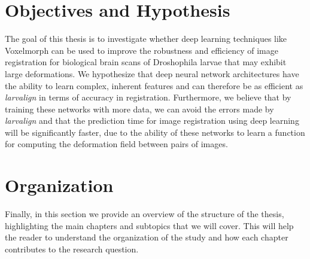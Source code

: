 \documentclass{book}
\begin{document}
	\section{Objectives and Hypothesis}
	The goal of this thesis is to investigate whether deep learning techniques like Voxelmorph \cite{Balakrishnan_2019} can be used to improve the robustness and efficiency of image registration for biological brain scans of Droshophila larvae that may exhibit large deformations. We hypothesize that deep neural network architectures have the ability to learn complex, inherent features and can therefore be as efficient as \textit{larvalign} \cite{larvalign} in terms of accuracy in registration. Furthermore, we believe that by training these networks with more data, we can avoid the errors made by \textit{larvalign} \cite{larvalign} and that the prediction time for image registration using deep learning will be significantly faster, due to the ability of these networks to learn a function for computing the deformation field between pairs of images.

	\section{Organization}
	Finally, in this section we provide an overview of the structure of the thesis, highlighting the main chapters and subtopics that we will cover. This will help the reader to understand the organization of the study and how each chapter contributes to the research question.
	
\end{document}
